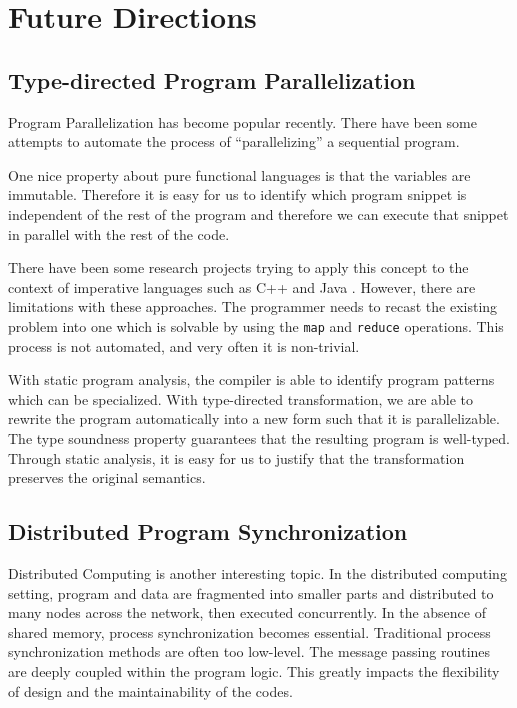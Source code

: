 \documentclass[12pt]{article}
\theoremstyle{plain} \numberwithin{equation}{section}
\theoremstyle{definition}
\begin{document}
\section{Future Directions}

\subsection{Type-directed Program Parallelization}
Program Parallelization has become popular recently. There have been 
some attempts to automate the process of ``parallelizing'' a
sequential program.

One nice property about pure functional languages is that
the variables are immutable. Therefore it is easy for us to identify
which program snippet is independent of the rest of the program
and therefore we can execute that snippet in parallel with the rest of
the code. 

There have been some research projects trying to apply this concept
to the context of imperative languages such as C++ \cite{mapreduce} 
and Java \cite{hadoop}. However, there are limitations with these
approaches. The programmer needs to recast the existing problem into 
one which is solvable by using the {\tt map} and {\tt reduce} operations.
This process is not automated, and very often it is non-trivial.

With static program analysis, the compiler
is able to identify program patterns which can be specialized.
With type-directed transformation, we are able to rewrite the program 
automatically into a new form such that it is parallelizable. The 
type soundness property guarantees that the resulting program is
well-typed. Through static analysis, it is easy for us to justify that the
transformation preserves the original semantics.


\subsection{Distributed Program Synchronization}
Distributed Computing is another interesting topic. In the distributed
computing setting, program and data are fragmented into smaller parts and 
distributed to many nodes across the network, then executed concurrently. 
In the absence of shared
memory, process synchronization becomes essential. Traditional process
synchronization methods are often too low-level. The message passing routines
are deeply coupled within the program logic. This greatly impacts 
the flexibility of design and the maintainability of the codes.
\end{document}
